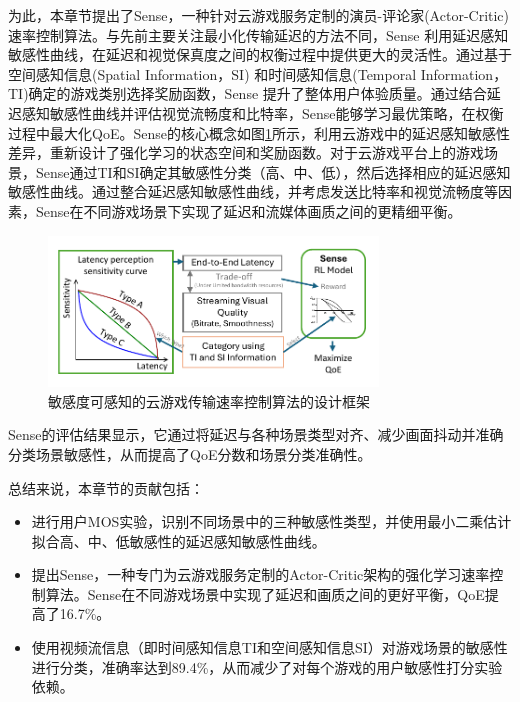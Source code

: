 为此，本章节提出了Sense，一种针对云游戏服务定制的演员-评论家(Actor-Critic)速率控制算法。与先前主要关注最小化传输延迟的方法不同，Sense 利用延迟感知敏感性曲线，在延迟和视觉保真度之间的权衡过程中提供更大的灵活性。通过基于空间感知信息(Spatial Information，SI) 和时间感知信息(Temporal Information，TI)确定的游戏类别选择奖励函数，Sense 提升了整体用户体验质量。通过结合延迟感知敏感性曲线并评估视觉流畅度和比特率，Sense能够学习最优策略，在权衡过程中最大化QoE。Sense的核心概念如图\ref{fig:teaser}所示，利用云游戏中的延迟感知敏感性差异，重新设计了强化学习的状态空间和奖励函数。对于云游戏平台上的游戏场景，Sense通过TI和SI确定其敏感性分类（高、中、低），然后选择相应的延迟感知敏感性曲线。通过整合延迟感知敏感性曲线，并考虑发送比特率和视觉流畅度等因素，Sense在不同游戏场景下实现了延迟和流媒体画质之间的更精细平衡。

\begin{figure}[h]
    \centering
    \includegraphics[width=0.78\textwidth]{figures/chap03/teaser.pdf}
    \caption{敏感度可感知的云游戏传输速率控制算法的设计框架}
    \label{fig:teaser}
\end{figure}

Sense的评估结果显示，它通过将延迟与各种场景类型对齐、减少画面抖动并准确分类场景敏感性，从而提高了QoE分数和场景分类准确性。

总结来说，本章节的贡献包括：
\begin{itemize}

\item 进行用户MOS实验，识别不同场景中的三种敏感性类型，并使用最小二乘估计拟合高、中、低敏感性的延迟感知敏感性曲线。
  
\item 提出Sense，一种专门为云游戏服务定制的Actor-Critic架构的强化学习速率控制算法。Sense在不同游戏场景中实现了延迟和画质之间的更好平衡，QoE提高了16.7\%。

\item 使用视频流信息（即时间感知信息TI和空间感知信息SI）对游戏场景的敏感性进行分类，准确率达到89.4\%，从而减少了对每个游戏的用户敏感性打分实验依赖。
\end{itemize}


